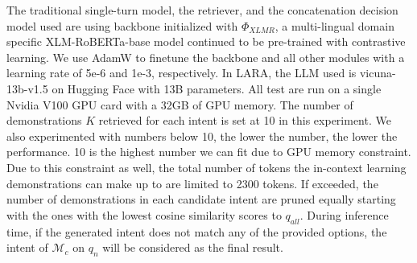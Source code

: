 
The traditional single-turn model, the retriever, and the concatenation decision model used are using backbone initialized with $\Phi_{XLMR}$, a multi-lingual domain specific XLM-RoBERTa-base model continued to be pre-trained with contrastive learning. We use AdamW to finetune the backbone and all other modules with a learning rate of 5e-6 and 1e-3, respectively. In LARA, the LLM used is vicuna-13b-v1.5 on Hugging Face with 13B parameters. All test are run on a single Nvidia V100 GPU card with a 32GB of GPU memory. The number of demonstrations $K$ retrieved for each intent is set at 10 in this experiment. We also experimented with numbers below 10, the lower the number, the lower the performance. 10 is the highest number we can fit due to GPU memory constraint. Due to this constraint as well, the total number of tokens the in-context learning demonstrations can make up to are limited to 2300 tokens. If exceeded, the number of demonstrations in each candidate intent are pruned equally starting with the ones with the lowest cosine similarity scores to $q_{all}$. During inference time, if the generated intent does not match any of the provided options, the intent of $\mathcal{M}_c$ on $q_n$ will be considered as the final result. 

